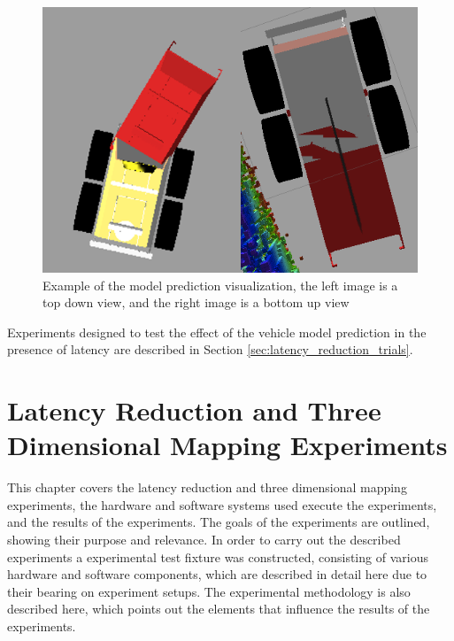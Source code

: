 \documentclass[12pt]{report}
\begin{document}
\begin{figure}[ht]
  \centering
  \includegraphics[width=5in,keepaspectratio]{latency_ss.png}
  \caption{Example of the model prediction visualization, the left image is a top down view, and the right image is a bottom up view}
  \label{fig:latency_ss}
\end{figure}

Experiments designed to test the effect of the vehicle model prediction in the presence of latency are described in Section \ref{sec:latency_reduction_trials}.


\chapter{Latency Reduction and Three Dimensional Mapping Experiments}\label{chap:experiments}
This chapter covers the latency reduction and three dimensional mapping experiments, the hardware and software systems used execute the experiments, and the results of the experiments.  The goals of the experiments are outlined, showing their purpose and relevance.  In order to carry out the described experiments a experimental test fixture was constructed, consisting of various hardware and software components, which are described in detail here due to their bearing on experiment setups.  The experimental methodology is also described here, which points out the elements that influence the results of the experiments.
\end{document}

